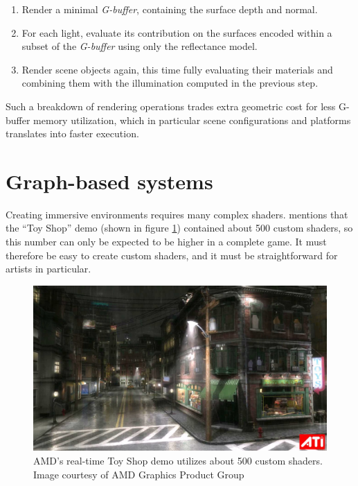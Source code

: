 \begin{enumerate}
\item Render a minimal \emph{G-buffer}, containing the surface depth and normal.
\item For each light, evaluate its contribution on the surfaces encoded within a subset of the \emph{G-buffer} using only the reflectance model.
\item Render scene objects again, this time fully evaluating their materials and combining them with the illumination computed in the previous step.
\end{enumerate}

Such a breakdown of rendering operations trades extra geometric cost for less G-buffer memory utilization, which in particular scene configurations and platforms translates into faster execution.


\section{Graph-based systems}

Creating immersive environments requires many complex shaders. \citet{Tatarchuk06ToyShop} mentions that the ``Toy Shop'' demo (shown in figure \ref{fig:ATItoyshop}) contained about 500 custom shaders, so this number can only be expected to be higher in a complete game. It must therefore be easy to create custom shaders, and it must be straightforward for artists in particular.

\begin{figure}[h!]
  \centering
    \includegraphics[width=0.9\linewidth]{./Chapters/ati-demo-toyshop.jpg}
    \caption[ToyShop demo]{AMD's real-time Toy Shop demo utilizes about 500 custom shaders. Image courtesy of AMD Graphics Product Group}
  \label{fig:ATItoyshop}
\end{figure}

